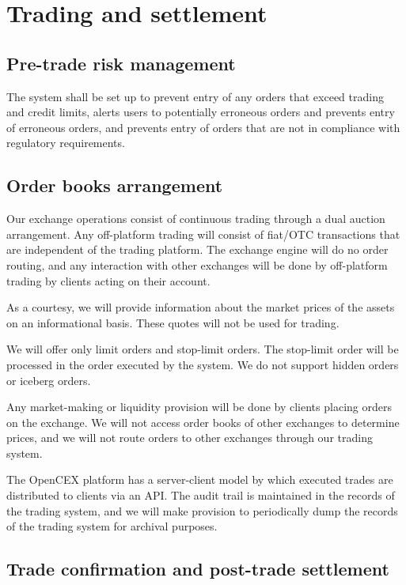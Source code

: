 \section{Trading and settlement}
\subsection{Pre-trade risk management}
The system shall be set up to prevent entry of any orders that exceed
trading and credit limits, alerts users to potentially erroneous orders
and prevents entry of erroneous orders, and prevents entry of orders
that are not in compliance with regulatory requirements.

\subsection{Order books arrangement}

Our exchange operations consist of continuous trading through a dual
auction arrangement.  Any off-platform trading will consist of
fiat/OTC transactions that are independent of the trading platform.
The exchange engine will do no order routing, and any interaction with
other exchanges will be done by off-platform trading by clients acting
on their account.

As a courtesy, we will provide information about the market prices of
the assets on an informational basis.  These quotes will not be used
for trading.

We will offer only limit orders and stop-limit orders.  The stop-limit
order will be processed in the order executed by the system.  We do
not support hidden orders or iceberg orders.

Any market-making or liquidity provision will be done by clients
placing orders on the exchange.  We will not access order books of
other exchanges to determine prices, and we will not route orders to
other exchanges through our trading system.

The OpenCEX platform has a server-client model by which executed
trades are distributed to clients via an API.  The audit trail is
maintained in the records of the trading system, and we will make
provision to periodically dump the records of the trading system for
archival purposes.


\subsection{Trade confirmation and post-trade settlement}

